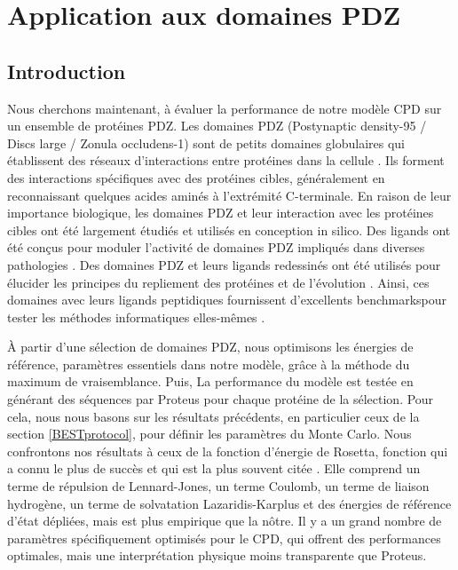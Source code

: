 \chapter{Application aux domaines PDZ}
\label{chap:PDZ}

\section{Introduction}

Nous cherchons maintenant, à évaluer la performance de notre modèle CPD sur un ensemble de protéines PDZ. Les domaines PDZ (\og Postynaptic density-95 / Discs large / Zonula occludens-1\fg) sont de petits domaines globulaires qui établissent des réseaux d'interactions entre protéines dans la cellule \citep{Harris01,Hung02,Tonikian08,Gfeller11,Subbaiah11}. Ils forment des interactions spécifiques avec des protéines cibles, généralement en reconnaissant quelques acides aminés à l'extrémité C-terminale. En raison de leur importance biologique, les domaines PDZ et leur interaction avec les protéines cibles ont été largement étudiés et utilisés en conception in silico. Des ligands ont été conçus  pour moduler l'activité de domaines PDZ impliqués dans diverses pathologies \citep{Roberts12,Zheng15}. Des domaines  PDZ et leurs  ligands redessinés ont été utilisés pour élucider les principes du repliement des protéines et de l'évolution \cite{Kong09,Mclaughlin12,Melero14}. Ainsi, ces domaines avec leurs ligands peptidiques fournissent d'excellents \og benchmarks\fg pour tester les méthodes informatiques elles-mêmes \cite{Reina02,Smith10}.

À partir d'une sélection de domaines PDZ, nous optimisons les énergies de référence, paramètres essentiels dans notre modèle, grâce à la méthode du maximum de vraisemblance. Puis, La performance du modèle est testée en générant des séquences par Proteus pour chaque protéine de la sélection. Pour cela, nous nous basons sur les résultats précédents, en particulier ceux de la section \ref{BESTprotocol}, pour définir les paramètres du Monte Carlo. Nous confrontons nos résultats à ceux de la fonction d'énergie de Rosetta, fonction qui a connu le plus de succès et qui est la plus souvent citée \cite{Baker06}. Elle comprend un terme de répulsion de Lennard-Jones, un terme Coulomb, un terme de liaison hydrogène, un terme de solvatation Lazaridis-Karplus et des énergies de référence d'état dépliées, mais est plus empirique que la nôtre. Il y a un grand nombre de paramètres spécifiquement optimisés pour le CPD, qui offrent des performances optimales, mais une interprétation physique moins transparente que Proteus.
   
